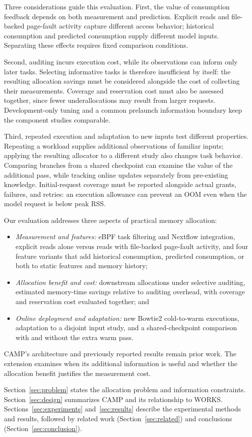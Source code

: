 Three considerations guide this evaluation. First, the value of
consumption feedback depends on both measurement and prediction. Explicit
reads and file-backed page-fault activity capture different access behavior;
historical consumption and predicted consumption supply different model
inputs. Separating these effects requires fixed comparison conditions.

Second, auditing incurs execution cost, while its observations can inform only
later tasks. Selecting informative tasks is therefore insufficient by
itself: the resulting allocation savings must be considered alongside the
cost of collecting their measurements. Coverage and reservation cost must
also be assessed together, since fewer underallocations may result from
larger requests. Development-only tuning and a common prelaunch information
boundary keep the component studies comparable.

Third, repeated execution and adaptation to new inputs test different
properties. Repeating a workload supplies additional observations of
familiar inputs; applying the resulting allocator to a different study
also changes task behavior. Comparing branches from a shared checkpoint
can examine the value of the additional pass, while tracking online updates
separately from pre-existing knowledge. Initial-request coverage must be
reported alongside actual grants, failures, and retries: an execution
allowance can prevent an OOM even when the model request is below peak RSS.

Our evaluation addresses three aspects of practical memory allocation:
\begin{itemize}
\item \emph{Measurement and features:} eBPF task filtering and Nextflow
integration, explicit reads alone versus reads with file-backed page-fault
activity, and four feature variants that add historical consumption,
predicted consumption, or both to static features and memory history;
\item \emph{Allocation benefit and cost:} downstream allocations under
selective auditing, estimated memory-time savings relative to auditing
overhead, with coverage and reservation cost evaluated together; and
\item \emph{Online deployment and adaptation:} new Bowtie2 cold-to-warm executions, adaptation to a disjoint input study,
and a shared-checkpoint comparison with and without the extra warm pass.
\end{itemize}
CAMP's architecture and previously reported results remain prior work.
The extension examines when its additional information is useful and
whether the allocation benefit justifies the measurement cost.

Section~\ref{sec:problem} states the allocation problem and information
constraints. Section~\ref{sec:design} summarizes CAMP and its relationship
to WORKS. Sections~\ref{sec:experiments} and~\ref{sec:results} describe the
experimental methods and results, followed by related work
(Section~\ref{sec:related}) and conclusions
(Section~\ref{sec:conclusion}).
